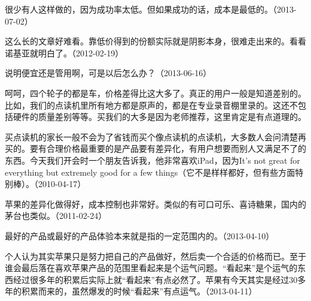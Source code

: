 
很少有人这样做的，因为成功率太低。但如果成功的话，成本是最低的。（2013-07-02）


这么长的文章好难看。靠低价得到的份额实际就是阴影本身，很难走出来的。看看诺基亚就明白了。（2012-02-19）


说明便宜还是管用啊，可是以后怎么办？（2013-06-16）


呵呵，四个轮子的都是车，价格差得比这大多了。真正的用户一般是知道差别的。比如，我们的点读机里所有地方都是原声的，都是在专业录音棚里录的。这还不包括硬件的质量差别等等。买我们的大多是因为老师推荐，这里肯定是有点道理的。

买点读机的家长一般不会为了省钱而买个像点读机的点读机，大多数人会问清楚再买的。要有合理价格最重要的是产品要有差异化，有用户想要而别人又满足不了的东西。今天我们开会时一个朋友告诉我，他非常喜欢iPad，因为It's not great for everything but extremely good for a few things（它不是样样都好，但有些方面特别棒）。（2010-04-17）


苹果的差异化做得好，成本控制也非常好。类似的有可口可乐、喜诗糖果，国内的茅台也类似。（2011-02-24）


最好的产品或最好的产品体验本来就是指的一定范围内的。（2013-04-10）


个人认为其实苹果只是努力把自己的产品做好，然后卖一个合适的价格而已。至于谁会最后落在喜欢苹果产品的范围里看起来是个运气问题。“看起来”是个运气的东西经过很多年的积累后实际上就“看起来”有点必然了。苹果有今天其实是经过30多年的积累而来的，虽然爆发的时候“看起来”有点运气。（2013-04-11）

